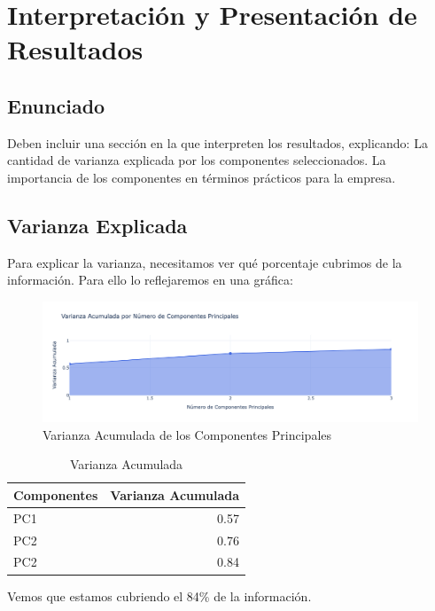 \newpage
\section{Interpretación y Presentación de Resultados}
\subsection{Enunciado}
Deben incluir una sección en la que interpreten los resultados, explicando:
La cantidad de varianza explicada por los componentes seleccionados.
La importancia de los componentes en términos prácticos para la empresa.

\subsection{Varianza Explicada}
Para explicar la varianza, necesitamos ver qué porcentaje cubrimos de la información. Para ello lo reflejaremos en una gráfica:


\begin{figure}[H]
    \centering
    \includegraphics[width=1\textwidth]{images/varianza_acumulada_componentes_principales.png}
    \caption{Varianza Acumulada de los Componentes Principales}
    \label{fig:variance_acum_main_components}
\end{figure}

\begin{table}[h!]
    \centering
    \begin{tabular}{|l|r|}
    \hline
    \textbf{Componentes} & \textbf{Varianza Acumulada} \\ \hline
    PC1                  & 0.57  \\ \hline
    PC2                  & 0.76  \\ \hline
    PC2                  & 0.84  \\ \hline
    \end{tabular}
    \caption{Varianza Acumulada}
\end{table}

Vemos que estamos cubriendo el 84\% de la información.

